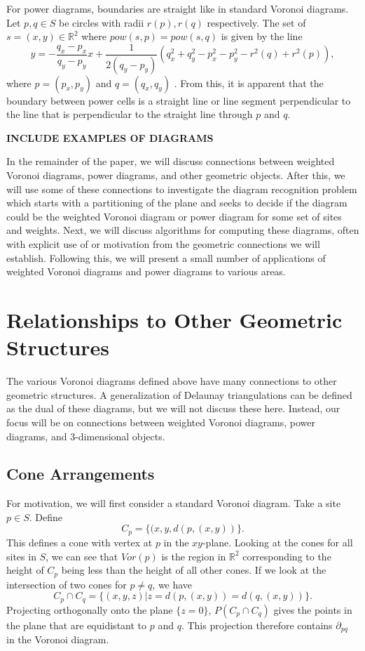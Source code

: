 \documentclass[a4paper, 11pt]{article}
\newcommand{\R}{\mathbb{R}}
\begin{document}
For power diagrams, boundaries are straight like in standard Voronoi diagrams. Let $p, q \in S$ be circles with radii $r(p), r(q)$ respectively. The set of $s = (x,y) \in \R^2$ where $pow(s,p) = pow(s,q)$
is given by the line
\begin{equation*}
  y = -\frac{q_x - p_x}{q_y - p_y} x + \frac{1}{2(q_y - p_y)} \left(q_x^2 + q_y^2 - p_x^2 - p_y^2 - r^2(q) + r^2(p) \right),
  \label{eq:pow_intersect}
\end{equation*}
where $p = (p_x, p_y)$ and $q = (q_x, q_y)$ \cite{aurenhammer_power}. From this, it is apparent that the boundary between power cells is a straight line or line segment perpendicular to the
line that is perpendicular to the straight line through $p$ and $q$.

\textbf{INCLUDE EXAMPLES OF DIAGRAMS}

In the remainder of the paper, we will discuss connections between weighted Voronoi diagrams, power diagrams, and other geometric objects. After this,
we will use some of these connections to investigate the diagram recognition problem which starts with a partitioning of the plane and seeks to decide if the diagram could be the
weighted Voronoi diagram or power diagram for some set of sites and weights. Next, we will discuss algorithms for computing these diagrams, often with
explicit use of or motivation from the geometric connections we will establish. Following this, we will present a small number of applications of
weighted Voronoi diagrams and power diagrams to various areas.

\section{Relationships to Other Geometric Structures}
\label{sec:geom_rel}
The various Voronoi diagrams defined above have many connections to other geometric structures. A generalization of Delaunay triangulations can be
defined as the dual of these diagrams, but we will not discuss these here. Instead, our focus will be on connections between weighted Voronoi
diagrams, power diagrams, and 3-dimensional objects.

\subsection{Cone Arrangements}
\label{cone}
For motivation, we will first consider a standard Voronoi diagram. Take a site $p \in S$. Define
\[ C_p = \{ (x, y, d(p, (x,y)) \}. \]
This defines a cone with vertex at $p$ in the $xy$-plane. Looking at the cones for all sites in $S$, we can see that $Vor(p)$ is the region in $\R^2$ corresponding to the height of $C_p$ being
less than the height of all other cones. If we look at the intersection of two cones for $p \neq q$, we have
\[ C_p \cap C_{q} = \{ (x,y,z) | z = d(p, (x,y)) = d(q, (x,y)) \}. \]
Projecting orthogonally onto the plane $\{z = 0\}$, $P(C_p \cap C_{q})$ gives the points in the plane that are equidistant to $p$ and $q$. This projection therefore contains
$\partial_{pq}$ in the Voronoi diagram.
\end{document}

